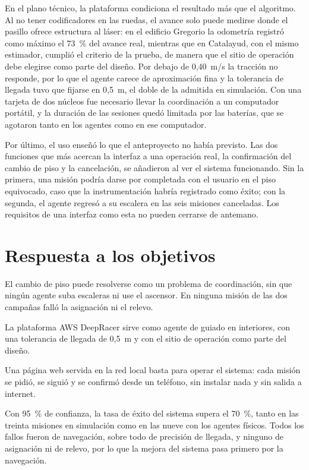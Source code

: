 En el plano técnico, la plataforma condiciona el resultado más que el algoritmo. Al no tener
codificadores en las ruedas, el avance solo puede medirse donde el pasillo ofrece estructura al
láser: en el edificio Gregorio la odometría registró como máximo el 73~\% del avance real,
mientras que en Catalayud, con el mismo estimador, cumplió el criterio de la prueba, de manera que
el sitio de operación debe elegirse como parte del diseño. Por debajo de 0,40~m/s la tracción no
responde, por lo que el agente carece de aproximación fina y la tolerancia de llegada tuvo que
fijarse en 0,5~m, el doble de la admitida en simulación. Con una tarjeta de dos núcleos fue
necesario llevar la coordinación a un computador portátil, y la duración de las sesiones quedó
limitada por las baterías, que se agotaron tanto en los agentes como en ese computador.

Por último, el uso enseñó lo que el anteproyecto no había previsto. Las dos funciones que más
acercan la interfaz a una operación real, la confirmación del cambio de piso y la cancelación, se
añadieron al ver el sistema funcionando. Sin la primera, una misión podría darse por completada con
el usuario en el piso equivocado, caso que la instrumentación habría registrado como éxito; con la
segunda, el agente regresó a su escalera en las seis misiones canceladas. Los requisitos de una
interfaz como esta no pueden cerrarse de antemano.

\section*{Respuesta a los objetivos}

El cambio de piso puede resolverse como un problema de coordinación, sin que ningún agente suba
escaleras ni use el ascensor. En ninguna misión de las dos campañas falló la asignación ni el
relevo.

La plataforma AWS DeepRacer sirve como agente de guiado en interiores, con una tolerancia de llegada
de 0,5~m y con el sitio de operación como parte del diseño.

Una página web servida en la red local basta para operar el sistema: cada misión se pidió, se siguió
y se confirmó desde un teléfono, sin instalar nada y sin salida a internet.

Con 95~\% de confianza, la tasa de éxito del sistema supera el 70~\%, tanto en las treinta misiones
en simulación como en las nueve con los agentes físicos. Todos los fallos fueron de navegación,
sobre todo de precisión de llegada, y ninguno de asignación ni de relevo, por lo que la mejora del
sistema pasa primero por la navegación.

